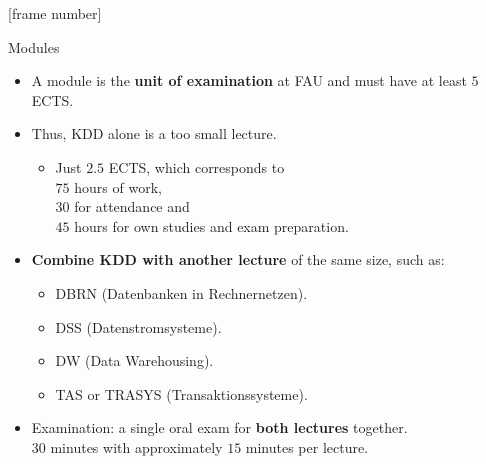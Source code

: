 \documentclass[aspectratio=169,t]{beamer}
\begin{document}
{ %
	[frame number]
	\begin{frame}{Modules}
		\begin{itemize}
			\item A module is the \textbf{unit of examination} at FAU and must have at least $5$ ECTS.
			\item Thus, KDD alone is a too small lecture.
			      \begin{itemize}
				      \item Just $2.5$ ECTS, which corresponds to \\
				            $75$ hours of work, \\
				            $30$ for attendance and \\
				            $45$ hours for own studies and exam preparation.
			      \end{itemize}
			\item \textbf{Combine KDD with another lecture} of the same size, such as:
			      \begin{itemize}
				      \item DBRN (Datenbanken in Rechnernetzen).
				      \item DSS (Datenstromsysteme).
				      \item DW (Data Warehousing).
				      \item TAS or TRASYS (Transaktionssysteme).
			      \end{itemize}
			\item Examination: a single oral exam for \textbf{both lectures} together.\\
			      $30$ minutes with approximately $15$ minutes per lecture.
		\end{itemize}
	\end{frame}
}
\end{document}
